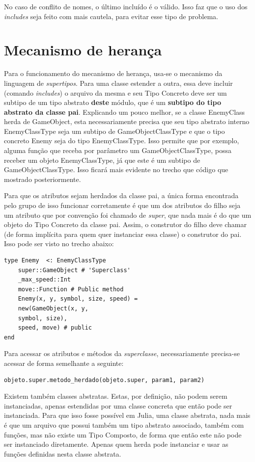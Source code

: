 \documentclass[rel_mlp]{iiufrgs}
\begin{document}
No caso de conflito de nomes, o último incluído é o válido. Isso faz que o uso dos \textit{includes} seja feito com mais cautela, para evitar esse tipo de problema.

\section{Mecanismo de herança}

Para o funcionamento do mecanismo de herança, usa-se o mecanismo da linguagem de \textit{supertipos}. Para uma classe estender a outra, essa deve incluir (comando \textit{includes}) o arquivo da mesma e seu Tipo Concreto deve ser um subtipo de um tipo abstrato \textbf{deste} módulo, que é um \textbf{subtipo do tipo abstrato da classe pai}. Explicando um pouco melhor, se a classe EnemyClass herda de GameObject, esta necessariamente precisa que seu tipo abstrato interno EnemyClassType seja um subtipo de GameObjectClassType e que o tipo concreto Enemy seja do tipo EnemyClassType. Isso permite que por exemplo, alguma função que receba por parâmetro um GameObjectClassType, possa receber um objeto EnemyClassType, já que este é um subtipo de GameObjectClassType. Isso ficará mais evidente no trecho que código que mostrado posteriormente.

Para que os atributos sejam herdados da classe pai, a única forma encontrada pelo grupo de isso funcionar corretamente é que um dos atributos do filho seja um atributo que por convenção foi chamado de \textit{super}, que nada mais é do que um objeto do Tipo Concreto da classe pai. Assim, o construtor do filho deve chamar (de forma implícita para quem quer instanciar essa classe) o construtor do pai. Isso pode ser visto no trecho abaixo:

\begin{lstlisting}[frame=single]
type Enemy  <: EnemyClassType 
    super::GameObject # 'Superclass'
    _max_speed::Int
    move::Function # Public method
	Enemy(x, y, symbol, size, speed) =
	new(GameObject(x, y, 
	symbol, size), 
	speed, move) # public
end
\end{lstlisting}

Para acessar os atributos e métodos da \textit{superclasse}, necessariamente precisa-se acessar de forma semelhante a seguinte:
\begin{lstlisting}[frame=single]
objeto.super.metodo_herdado(objeto.super, param1, param2)
\end{lstlisting}


Existem também classes abstratas. Estas, por definição, não podem serem instanciadas, apenas estendidas por uma classe concreta que então pode ser instanciada. Para que isso fosse possível em Julia, uma classe abstrata, nada mais é que um arquivo que possui também um tipo abstrato associado, também com funções, mas não existe um Tipo Composto, de forma que então este não pode ser instanciado diretamente. Apenas quem herda pode instanciar e usar as funções definidas nesta classe abstrata. 
\end{document}
